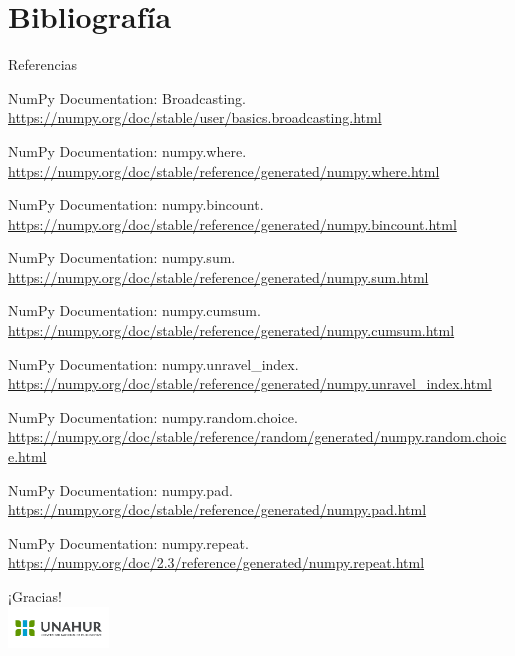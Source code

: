 \documentclass{beamer}
\begin{document}
\section{Bibliografía}
	
	\begin{frame}{Referencias}
		\tiny
		\begin{thebibliography}{10}
			\beamertemplatebookbibitems
			NumPy Documentation: Broadcasting. 
			\newblock \url{https://numpy.org/doc/stable/user/basics.broadcasting.html}
			
			NumPy Documentation: numpy.where. 
			\newblock \url{https://numpy.org/doc/stable/reference/generated/numpy.where.html}
			
			NumPy Documentation: numpy.bincount. 
			\newblock \url{https://numpy.org/doc/stable/reference/generated/numpy.bincount.html}
			
			NumPy Documentation: numpy.sum. 
			\newblock \url{https://numpy.org/doc/stable/reference/generated/numpy.sum.html}
			
			NumPy Documentation: numpy.cumsum. 
			\newblock \url{https://numpy.org/doc/stable/reference/generated/numpy.cumsum.html}
			
			NumPy Documentation: numpy.unravel\_index. 
			\newblock \url{https://numpy.org/doc/stable/reference/generated/numpy.unravel_index.html}
			
			NumPy Documentation: numpy.random.choice. 
			\newblock \url{https://numpy.org/doc/stable/reference/random/generated/numpy.random.choice.html}
			
			NumPy Documentation: numpy.pad. 
			\newblock \url{https://numpy.org/doc/stable/reference/generated/numpy.pad.html}
			
			NumPy Documentation: numpy.repeat. 
			\newblock \url{https://numpy.org/doc/2.3/reference/generated/numpy.repeat.html}
		\end{thebibliography}
	\end{frame}
	
	\begin{frame}{}
		\centering
		{\huge ¡Gracias!}\\
		\vspace{1cm}
		\includegraphics[width=0.2\textwidth]{UNAHUR.png}
	\end{frame}
	
\end{document}

